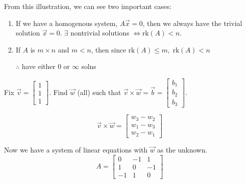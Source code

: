\documentclass[../main.tex]{subfiles}
\begin{document}
From this illustration, we can see two important cases:
\begin{enumerate}
    \item If we have a homogenous system, \( A \vec{x}=0 \), then we always have the trivial solution \( \vec{x}=0 \).
        \( \exists \) nontrivial solutions \(\iff \text{rk}(A)<n \).
    \item If \( A \) is \( m \times n \) and \( m < n \), then since \( \text{rk}(A) \leq m, \; \text{rk}(A) < n \)

        \( \therefore \) have either 0 or \( \infty \) solns
\end{enumerate}

\begin{example}[]
    Fix \( \vec{v} =
    \begin{bmatrix}
        1 \\
        1 \\
        1
    \end{bmatrix} \).
    Find \( \vec{w} \) (all) such that
    \( \vec{v} \times \vec{w} = \vec{b} =
    \begin{bmatrix}
        b_1 \\
        b_2 \\
        b_3
    \end{bmatrix} \).

    \[ \vec{v} \times \vec{w} = \begin{bmatrix}
        w_3 - w_2 \\
        w_1 - w_3 \\
        w_2 - w_1
    \end{bmatrix} \]

    Now we have a system of linear equations with \( \vec{w} \) as the unknown.
    \[ A =
        \begin{bmatrix}
            0 & -1 & 1 \\
            1 & 0 & -1 \\
            -1 & 1 & 0
        \end{bmatrix}
    \]


\end{example}
\end{document}
